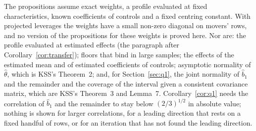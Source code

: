 The propositions assume exact weights, a profile evaluated at fixed characteristics, known coefficients of
controls and a fixed centring constant. With projected leverages the weights have a small non-zero diagonal on
movers' rows, and no version of the propositions for these weights is proved here. Nor are: the profile evaluated
at estimated effects (the paragraph after Corollary~\ref{cor:transfer}); floors that bind in large samples; the
effects of the estimated mean and of estimated coefficients of controls; asymptotic normality of
$\hat\theta$, which is KSS's Theorem~2; and, for Section~\ref{sec:q1}, the joint normality of $\hat b_1$ and the
remainder and the coverage of the interval given a consistent covariance matrix, which are KSS's Theorem~3 and
Lemma~7. Corollary~\ref{cor:q1} needs the correlation of $\hat b_1$ and the remainder to stay below
$(2/3)^{1/2}$ in absolute value; nothing is shown for larger correlations, for a leading direction that rests on
a fixed handful of rows, or for an iteration that has not found the leading direction.
